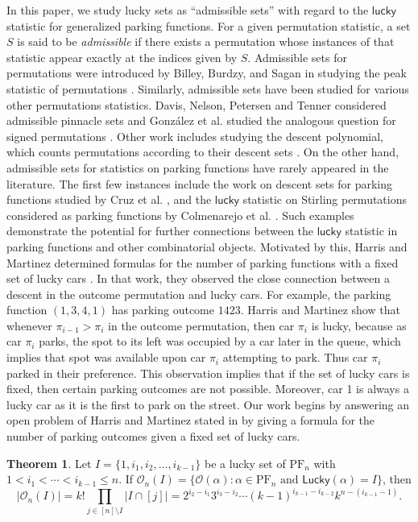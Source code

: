 \documentclass[reqno]{amsart}
\newcommand{\lucky}{\mathsf{lucky}}
\newcommand{\PF}{\mathrm{PF}}
\newcommand{\Lucky}{\mathsf{Lucky}}
\theoremstyle{definition}
\newtheorem{theorem}{Theorem}[section]
\theoremstyle{remark}
\newcommand{\out}{\mathcal{O}}
\begin{document}
In this paper, we study lucky sets as ``admissible sets'' with regard to the $\lucky$ statistic for generalized parking functions.
For a given permutation statistic, a set $S$ is said to be \emph{admissible} if there exists a permutation whose instances of that statistic appear exactly at the indices given by $S$. Admissible sets for permutations were introduced by Billey, Burdzy, and Sagan in studying the peak statistic of permutations  \cite{BilleyBurdzySagan}. Similarly, admissible sets have been studied
for various other permutations statistics. Davis, Nelson, Petersen and Tenner considered admissible pinnacle sets \cite{PinnacleSet} and  Gonz\'alez et al. studied the analogous question for signed permutations \cite{SignedPinnacles}. Other work includes studying the descent polynomial, which counts permutations according to their descent sets \cite{diazlopez2017descentpolynomials}. On the other hand, admissible sets for statistics on parking functions have rarely appeared in the literature. The first few instances include the work on descent sets for parking functions studied by Cruz et al. \cite{statsinPFs}, and the $\lucky$ statistic on Stirling permutations considered as parking functions by Colmenarejo et al. \cite{colmenarejo2024luckydisplacementstatisticsstirling}. Such examples demonstrate the potential for further connections between the $\lucky$ statistic in parking functions and other combinatorial objects. Motivated by this, Harris and Martinez determined formulas for the number of parking functions with a fixed set of lucky cars \cite{harrismartinez}. In that work, they observed the close connection between a descent in the outcome permutation and lucky cars. For example, the parking function $(1,3,4,1)$ has parking outcome $1423$. 
Harris and Martinez show that whenever $\pi_{i-1}>\pi_i$ in the outcome permutation, then car $\pi_i$ is lucky, because as car $\pi_i$ parks, the spot to its left was occupied by a car later in the queue, which implies that spot was available upon car $\pi_i$ attempting to park. Thus car $\pi_i$ parked in their preference. 
This observation implies that if the set of lucky cars is fixed, then certain parking outcomes are not possible. Moreover, car 1 is always a lucky car as it is the first to park on the street. Our work begins by answering an open problem of Harris and Martinez stated in \cite{harrismartinez} by giving a formula for the number of parking outcomes given a fixed set of lucky cars. 



\setcounter{section}{2} 
\setcounter{theorem}{1}
\begin{theorem}
Let $I = \{1, i_1, i_2, \ldots, i_{k-1}\}$ be a lucky set of $\PF_n$ with $1<i_1 <\cdots < i_{k-1} \leq n$. If $\out_n(I)=\{\out(\alpha):\alpha\in\PF_n\mbox{ and }\Lucky(\alpha)=I\}$, then
\[
|\out_n(I)|=k! \prod_{j\in [n]\setminus I} |I \cap [j]| = 2^{i_2-i_1} 3^{i_3-i_2} \cdots (k-1)^{i_{k-1} - i_{k-2}} k^{n -(i_{k-1}-1)}.
\]

\end{theorem}
\end{document}
